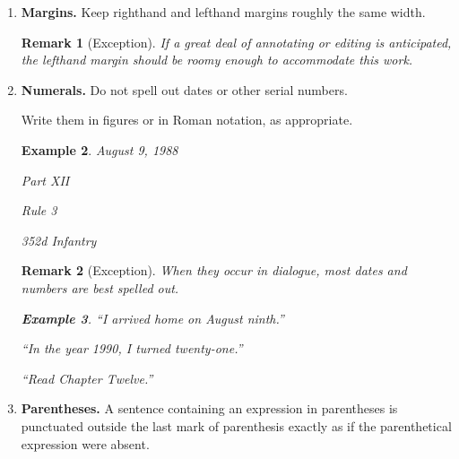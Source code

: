 \documentclass{article}
\newtheorem{example}{Example}
\newtheorem{remark}{Remark}
\begin{document}
\begin{enumerate}
	The steady evolution of the language seems to favor union: 2 words eventually become one, usually after a period of hyphenation.
	\begin{example}
		bed chamber $\to$ bed-chamber $\to$ bedchamber
		
		wild life $\to$ wild-life $\to$ wildlife
		
		bell boy $\to$ bell-boy $\to$ bellboy
	\end{example}
	The hyphen can play tricks on the unwary, as it did it Chattanooga when 2 newspapers merged - the {\it News} and the {\it Free Press}.
	
	Someone introduced a hyphen into the merger, and the paper became {\it The Chattanooga News-Free Press}, which sounds as though the paper were news-free, or devoid of news.
	
	Obviously, we ask too much of a hyphen when we ask it to cast its spell over words it does not adjoint.
	\item {\bf Margins.} Keep righthand and lefthand margins roughly the same width.
	
	\begin{remark}[Exception]
		If a great deal of annotating or editing is anticipated, the lefthand margin should be roomy enough to accommodate this work.
	\end{remark}
	\item {\bf Numerals.} Do not spell out dates or other serial numbers.
	
	Write them in figures or in Roman notation, as appropriate.
	\begin{example}
		August 9, 1988
		
		Part XII
		
		Rule 3
		
		352d Infantry
	\end{example}
	
	\begin{remark}[Exception]
		When they occur in dialogue, most dates and numbers are best spelled out.
		\begin{example}
			``I arrived home on August ninth.''
			
			``In the year 1990, I turned twenty-one.''
			
			``Read Chapter Twelve.''
		\end{example}
	\end{remark}
	\item {\bf Parentheses.} A sentence containing an expression in parentheses is punctuated outside the last mark of parenthesis exactly as if the parenthetical expression were absent.
	

\end{enumerate}
\end{document}
